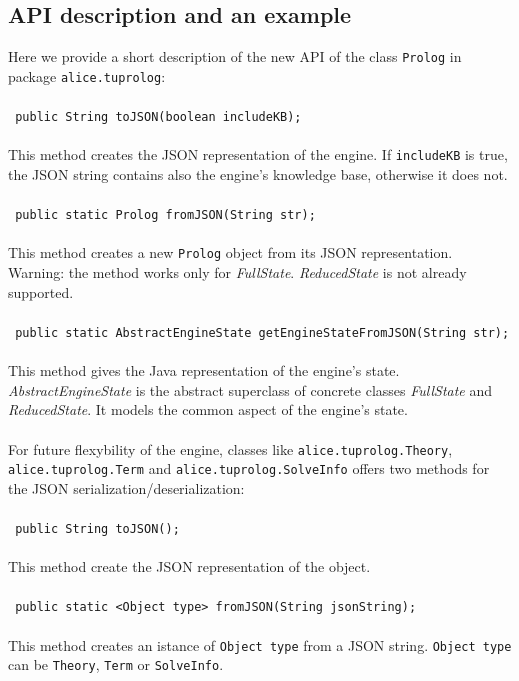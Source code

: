 \subsection{API description and an example}
Here we provide a short description of the new API of the class \texttt{Prolog} in package \texttt{alice.tuprolog}: \\ \\
{\small\tt
public String toJSON(boolean includeKB);
}\\ \\
This method creates the JSON representation of the \tuprolog{} engine. If \texttt{includeKB} is true, the JSON string contains also the engine's knowledge base, otherwise it does not.
\\ \\
{\small\tt
public static Prolog fromJSON(String str);
}\\ \\
This method creates a new \texttt{Prolog} object from its JSON representation.\\
Warning: the method works only for \textit{FullState}. \textit{ReducedState} is not already supported.
\\ \\
{\small\tt
public static AbstractEngineState getEngineStateFromJSON(String str);
}\\ \\
This method gives the Java representation of the \tuprolog{} engine's state. \textit{AbstractEngineState} is the abstract superclass of concrete classes \textit{FullState} and \textit{ReducedState}. It models the common aspect of the engine's state.
\\ \\
For future flexybility of the engine, classes like \texttt{alice.tuprolog.Theory}, \texttt{alice.tuprolog.Term} and \texttt{alice.tuprolog.SolveInfo} offers two methods for the JSON serialization/deserialization:
\\ \\
{\small\tt
	public String toJSON();
}\\ \\
This method create the JSON representation of the object.\\ \\
{\small\tt
	public static <Object type> fromJSON(String jsonString);
}\\ \\
This method creates an istance of \texttt{Object type} from a JSON string. \texttt{Object type} can be \texttt{Theory}, \texttt{Term} or \texttt{SolveInfo}.
